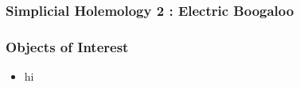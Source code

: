 \documentclass{beamer}
\begin{document}

\begin{frame}
  \frametitle{Simplicial Holemology 2 : Electric Boogaloo}

\end{frame}


\begin{frame}
  \frametitle{Objects of Interest}
  \begin{itemize}
    \item hi 
  


  \end{itemize}


\end{frame}

\end{document}
